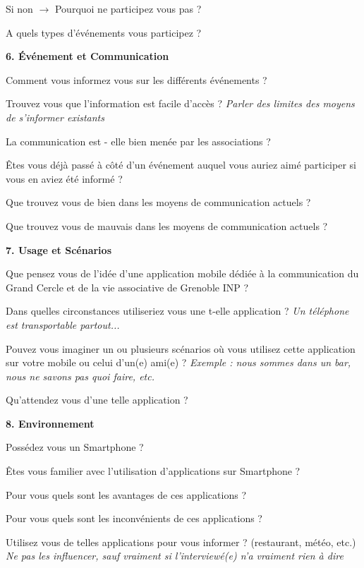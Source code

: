 \documentclass[a4paper, 11px]{article}
\begin{document}
Si non $\rightarrow$ Pourquoi ne participez vous pas ?

A quels types d'événements vous participez ?


\vspace{.3cm}

 \textbf {\large 6. Événement et Communication}

Comment vous informez vous sur les différents événements ?

Trouvez vous que l'information est facile d'accès ?
\textit{Parler des limites des moyens de s'informer existants}


La communication est - elle bien menée par les associations ?

Êtes vous déjà passé à côté d'un événement auquel vous auriez aimé participer si vous en aviez été informé ?

Que trouvez vous de bien dans les moyens de communication actuels ?


Que trouvez vous de mauvais dans les moyens de communication actuels ?


\vspace{.3cm}

 \textbf {\large 7. Usage et Scénarios}

Que pensez vous de l'idée d'une application mobile dédiée à la communication du Grand Cercle et de la vie associative de Grenoble INP ?


Dans quelles circonstances utiliseriez vous une t-elle application ?
\textit{Un téléphone est transportable partout...}


Pouvez vous imaginer un ou plusieurs scénarios où vous utilisez cette application sur votre mobile ou celui d'un(e) ami(e) ?
\textit{Exemple : nous sommes dans un bar, nous ne savons pas quoi faire, etc.}

Qu'attendez vous d'une telle application ?


\vspace{.3cm}

 \textbf {\large 8. Environnement}

Possédez vous un Smartphone ?

Êtes vous familier avec l'utilisation d'applications sur Smartphone ?

Pour vous quels sont les avantages de ces applications ?

Pour vous quels sont les inconvénients de ces applications ?

Utilisez vous de telles applications pour vous informer ? (restaurant, météo, etc.)
\textit {Ne pas les influencer, sauf vraiment si l'interviewé(e) n'a vraiment rien à dire}
\end{document}
